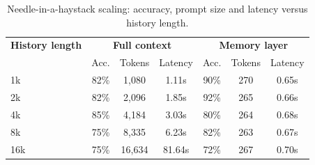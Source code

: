 \begin{table}[htbp]\centering\small
\begin{tabular}{lcccccc}\hline
\textbf{History length} & \multicolumn{3}{c}{\textbf{Full context}} & \multicolumn{3}{c}{\textbf{Memory layer}}\\
 & Acc. & Tokens & Latency & Acc. & Tokens & Latency\\\hline
1k & 82\% & 1,080 & 1.11s & 90\% & 270 & 0.65s\\
2k & 82\% & 2,096 & 1.85s & 92\% & 265 & 0.66s\\
4k & 85\% & 4,184 & 3.03s & 80\% & 264 & 0.68s\\
8k & 75\% & 8,335 & 6.23s & 82\% & 263 & 0.67s\\
16k & 75\% & 16,634 & 81.64s & 72\% & 267 & 0.70s\\
\hline\end{tabular}
\caption{Needle-in-a-haystack scaling: accuracy, prompt size and latency versus history length.}\label{tab:niah}\end{table}
